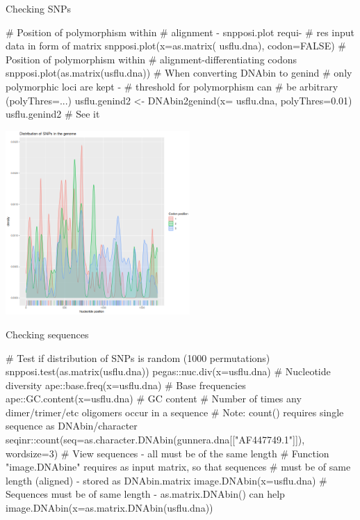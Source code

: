 \documentclass[compress, xelatex, 11pt, xcolor=svgnames, aspectratio=169,
	hyperref={
		bookmarks=true,
		unicode=true,
		colorlinks=true,
		pdftitle={Molecular data in R},
		plainpages=false,
		pdfauthor={Vojtech Zeisek},
		pdfsubject={Course about phylogeny and evolution in R},
		pdfcreator={XeLaTeX},
		pdfkeywords={R, evolution, phylogeny, molecular data},
		linkcolor=Crimson, %
		anchorcolor=Magenta, %
		citecolor=Magenta, %
		filecolor=Magenta, %
		menucolor=Magenta, %
		urlcolor=DodgerBlue, %
		},
	url={hyphens, lowtilde} %
	]{beamer}
\begin{document}
\begin{frame}[fragile]{Checking SNPs}
	\begin{multicols}{2}
		\begin{spluscode}
    # Position of polymorphism within
    # alignment - snpposi.plot requi-
    # res input data in form of matrix
    snpposi.plot(x=as.matrix(
      usflu.dna), codon=FALSE)
    # Position of polymorphism within
    # alignment-differentiating codons
    snpposi.plot(as.matrix(usflu.dna))
    # When converting DNAbin to genind
    # only polymorphic loci are kept -
    # threshold for polymorphism can
    # be arbitrary (polyThres=...)
    usflu.genind2 <- DNAbin2genind(x=
      usflu.dna, polyThres=0.01)
    usflu.genind2 # See it
		\end{spluscode}
		\begin{flushright}
			\includegraphics[height=7cm]{snpposi.png}
		\end{flushright}
	\end{multicols}
\end{frame}

\begin{frame}[fragile]{Checking sequences}
	\begin{spluscode}
    # Test if distribution of SNPs is random (1000 permutations)
    snpposi.test(as.matrix(usflu.dna))
    pegas::nuc.div(x=usflu.dna) # Nucleotide diversity
    ape::base.freq(x=usflu.dna) # Base frequencies
    ape::GC.content(x=usflu.dna) # GC content
    # Number of times any dimer/trimer/etc oligomers occur in a sequence
    # Note: count() requires single sequence as DNAbin/character
    seqinr::count(seq=as.character.DNAbin(gunnera.dna[["AF447749.1"]]),
      wordsize=3)
    # View sequences - all must be of the same length
    # Function "image.DNAbine" requires as input matrix, so that sequences
    # must be of same length (aligned) - stored as DNAbin.matrix
    image.DNAbin(x=usflu.dna)
    # Sequences must be of same length - as.matrix.DNAbin() can help
    image.DNAbin(x=as.matrix.DNAbin(usflu.dna))
	\end{spluscode}
\end{frame}
\end{document}
